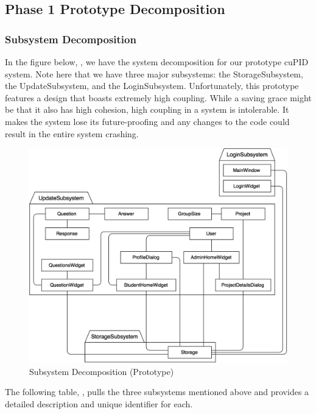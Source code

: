 \documentclass[12pt,letterpaper]{article}
\begin{document}
\subsection{Phase 1 Prototype Decomposition}
\subsubsection{Subsystem Decomposition}
In the figure below, , we have the system decomposition for our prototype cuPID system. Note here that we have three major subsystems: the StorageSubsystem, the UpdateSubsystem, and the LoginSubsystem. Unfortunately, this prototype features a design that boasts extremely high coupling. While a saving grace might be that it also has high cohesion, high coupling in a system is intolerable. It makes the system lose its future-proofing and any changes to the code could result in the entire system crashing.

\begin{figure}[H]
	\centering{}
	\includegraphics[scale=0.35]{imgs/d3/prototype/class-diagram.png}
	\caption{Subsystem Decomposition (Prototype)}
\end{figure}

\newpage{}
The following table, , pulls the three subsystems mentioned above and provides a detailed description and unique identifier for each.
\end{document}
